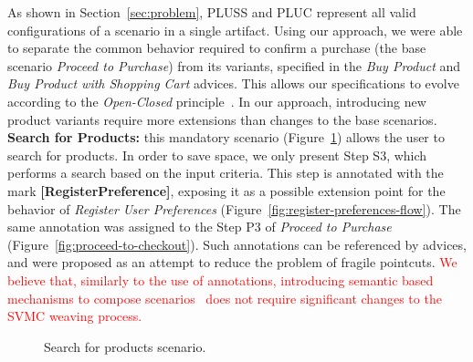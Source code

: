 \documentclass{acm_proc_article-sp}
\begin{document}
As shown in Section~\ref{sec:problem}, PLUSS and PLUC represent all valid
configurations of a scenario in a single artifact. Using our approach, we were
able to separate the common behavior required to confirm a purchase (the base
scenario \emph{Proceed to Purchase}) from its variants, specified in the
\emph{Buy Product} and \emph{Buy Product with Shopping Cart} advices. This allows
our specifications to evolve according to the \emph{Open-Closed}
principle~\cite{Meyer:2000aa}. In our approach, introducing new product variants
require more extensions than changes to the base scenarios. {\bf Search for
Products:} this mandatory scenario (Figure~\ref{fig:search-products-flow}) allows
the user to search for products. In order to save space, we only present Step S3,
which performs a search based on the input criteria. This step is annotated with
the mark \mbox{{\bf [RegisterPreference]}}, exposing it as a possible extension
point for the behavior of \emph{Register User Preferences}
(Figure~\ref{fig:register-preferences-flow}). The same annotation was assigned to
the Step P3 of \emph{Proceed to Purchase} (Figure~\ref{fig:proceed-to-checkout}).
Such annotations can be referenced by advices, and were proposed as an attempt to
reduce the problem of fragile pointcuts. \textcolor{red}{We believe that,
similarly to the use of annotations, introducing semantic based mechanisms to
compose scenarios~\cite{Chitchyan:2007aa} does not require significant changes to
the SVMC weaving process.}


\begin{figure}[ht]
\caption{Search for products scenario.}
\label{fig:search-products-flow}
\end{figure}
\end{document}
